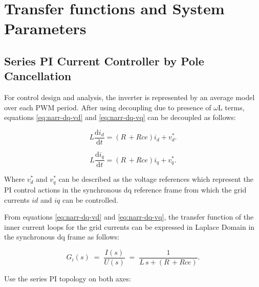 \section{Transfer functions and System Parameters}

\label{subsec:Transfer-Functions}

\subsection{Series PI Current Controller by Pole Cancellation}

\label{subsec:pi-current-series-pc}





For control design and analysis, the inverter is represented by an average model over each PWM period. After using decoupling due to presence of $\omega$L terms, equations \eqref{eq:narr-dq-vd} and \eqref{eq:narr-dq-vq} can be decoupled as follows:



\begin{equation}
	\label{eq:idcurr-dq}
	L\frac{\mathrm d i_d}{\mathrm d t} = (R\, + Rce) i_d + v^{*}_{d}.
\end{equation}



\begin{equation}
	\label{eq:iqcurr-dq}
	L\frac{\mathrm d i_q}{\mathrm d t} = (R\, + Rce) i_q + v^{*}_{q}.
\end{equation}



Where $v^{*}_{d}$ and $v^{*}_{q}$ can be described as the voltage references which represent the PI control actions in the synchronous dq reference frame from which the grid currents $id$ and $iq$ can be controlled.



From equations \eqref{eq:narr-dq-vd} and \eqref{eq:narr-dq-vq}, the transfer function of the inner current loops for the grid currents can be expressed in Laplace Domain in the synchronous dq frame as follows:



\begin{equation}
	\label{eq:cur-Gp}
	G_i(s) \;=\; \frac{I(s)}{U(s)} \;=\; \frac{1}{L\, s + (R\, + Rce)} .
\end{equation}



Use the series PI topology on both axes:

